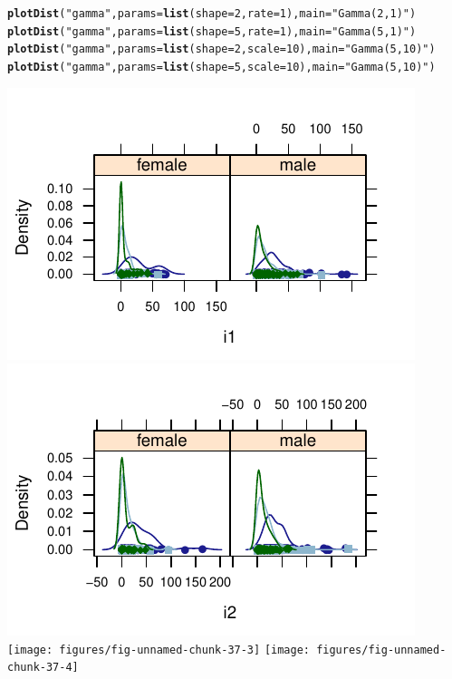 \documentclass[twoside]{book}\usepackage[]{graphicx}\usepackage[]{xcolor}
\makeatletter
\def\maxwidth{ %
  \ifdim\Gin@nat@width>\linewidth
    \linewidth
  \else
    \Gin@nat@width
  \fi
}
\newcommand{\hlnum}[1]{\textcolor[rgb]{0.686,0.059,0.569}{#1}}%
\newcommand{\hlstr}[1]{\textcolor[rgb]{0.192,0.494,0.8}{#1}}%
\newcommand{\hlstd}[1]{\textcolor[rgb]{0.345,0.345,0.345}{#1}}%
\newcommand{\hlkwc}[1]{\textcolor[rgb]{0.333,0.667,0.333}{#1}}%
\newcommand{\hlkwd}[1]{\textcolor[rgb]{0.737,0.353,0.396}{\textbf{#1}}}%
\newenvironment{kframe}{%
 \def\at@end@of@kframe{}%
 \ifinner\ifhmode%
  \def\at@end@of@kframe{\end{minipage}}%
  \begin{minipage}{\columnwidth}%
 \fi\fi%
 \def\FrameCommand##1{\hskip\@totalleftmargin \hskip-\fboxsep
 \colorbox{shadecolor}{##1}\hskip-\fboxsep
     \hskip-\linewidth \hskip-\@totalleftmargin \hskip\columnwidth}%
 \MakeFramed {\advance\hsize-\width
   \@totalleftmargin\z@ \linewidth\hsize
   \@setminipage}}%
 {\par\unskip\endMakeFramed%
 \at@end@of@kframe}
\newenvironment{knitrout}{}{} %
\makeatother
\begin{document}
\begin{knitrout}
\color{fgcolor}\begin{kframe}
\begin{alltt}
\hlkwd{plotDist}\hlstd{(}\hlstr{"gamma"}\hlstd{,} \hlkwc{params} \hlstd{=} \hlkwd{list}\hlstd{(}\hlkwc{shape} \hlstd{=} \hlnum{2}\hlstd{,} \hlkwc{rate} \hlstd{=} \hlnum{1}\hlstd{),} \hlkwc{main} \hlstd{=} \hlstr{"Gamma(2,1)"}\hlstd{)}
\hlkwd{plotDist}\hlstd{(}\hlstr{"gamma"}\hlstd{,} \hlkwc{params} \hlstd{=} \hlkwd{list}\hlstd{(}\hlkwc{shape} \hlstd{=} \hlnum{5}\hlstd{,} \hlkwc{rate} \hlstd{=} \hlnum{1}\hlstd{),} \hlkwc{main} \hlstd{=} \hlstr{"Gamma(5,1)"}\hlstd{)}
\hlkwd{plotDist}\hlstd{(}\hlstr{"gamma"}\hlstd{,} \hlkwc{params} \hlstd{=} \hlkwd{list}\hlstd{(}\hlkwc{shape} \hlstd{=} \hlnum{2}\hlstd{,} \hlkwc{scale} \hlstd{=} \hlnum{10}\hlstd{),} \hlkwc{main} \hlstd{=} \hlstr{"Gamma(5,10)"}\hlstd{)}
\hlkwd{plotDist}\hlstd{(}\hlstr{"gamma"}\hlstd{,} \hlkwc{params} \hlstd{=} \hlkwd{list}\hlstd{(}\hlkwc{shape} \hlstd{=} \hlnum{5}\hlstd{,} \hlkwc{scale} \hlstd{=} \hlnum{10}\hlstd{),} \hlkwc{main} \hlstd{=} \hlstr{"Gamma(5,10)"}\hlstd{)}
\end{alltt}
\end{kframe}

{\centering \includegraphics[width=\maxwidth]{figures/fig-unnamed-chunk-37-1} 
\includegraphics[width=\maxwidth]{figures/fig-unnamed-chunk-37-2} 
\texttt{[image: figures/fig-unnamed-chunk-37-3]} 
\texttt{[image: figures/fig-unnamed-chunk-37-4]} 

}



\end{knitrout}
\end{document}
